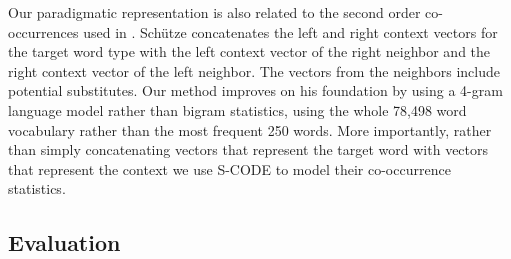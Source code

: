 Our paradigmatic representation is also related to the second order
co-occurrences used in \cite{Schutze:1995:DPT:976973.976994}.
Sch{\"u}tze concatenates the left and right context vectors for the
target word type with the left context vector of the right neighbor
and the right context vector of the left neighbor.  The vectors from
the neighbors include potential substitutes.  Our method improves on
his foundation by using a 4-gram language model rather than bigram
statistics, using the whole 78,498 word vocabulary rather than the
most frequent 250 words.  More importantly, rather than simply
concatenating vectors that represent the target word with vectors that
represent the context we use S-CODE to model their co-occurrence
statistics.

\subsection{Evaluation}

